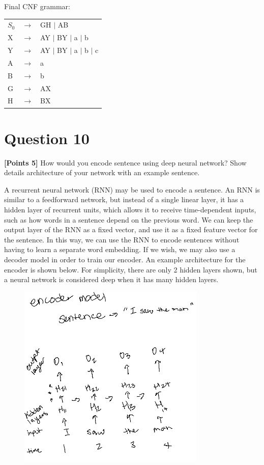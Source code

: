 \documentclass[12pt]{article}
\begin{document}
Final CNF grammar:
\begin{table}[!ht]
      \begin{tabular}{lll}
            $S_0$ & $\rightarrow$ & GH $|$ AB                   \\
            X     & $\rightarrow$ & AY $|$ BY $|$ a $|$ b       \\
            Y     & $\rightarrow$ & AY $|$ BY $|$ a $|$ b $|$ c \\
            A     & $\rightarrow$ & a                           \\
            B     & $\rightarrow$ & b                           \\
            G     & $\rightarrow$ & AX                          \\
            H     & $\rightarrow$ & BX                          \\
      \end{tabular}
\end{table}

\newpage
\section*{Question 10}
\textbf{[Points 5]} How would you encode sentence using deep neural network?
Show details architecture of your network with an example sentence.

A recurrent neural network (RNN) may be used to encode a sentence. An RNN is
similar to a feedforward network, but instead of a single linear layer, it has a
hidden layer of recurrent units, which allows it to receive time-dependent
inputs, such as how words in a sentence depend on the previous word. We can keep
the output layer of the RNN as a fixed vector, and use it as a fixed feature
vector for the sentence. In this way, we can use the RNN to encode sentences
without having to learn a separate word embedding. If we wish, we may also use a
decoder model in order to train our encoder. An example architecture for the
encoder is shown below. For simplicity, there are only 2 hidden layers shown,
but a neural network is considered deep when it has many hidden layers.

\begin{figure}
      \centering
      \includegraphics[width=0.8\textwidth]{assets/test2/p10.png}
\end{figure}
\end{document}
